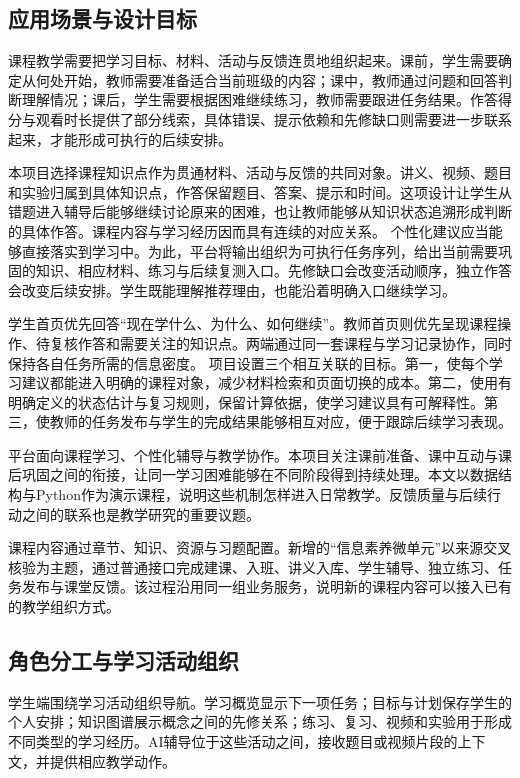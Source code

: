 \documentclass[UTF8,zihao=-4,fontset=none,a4paper]{ctexart}
\begin{document}
\subsection{应用场景与设计目标}

课程教学需要把学习目标、材料、活动与反馈连贯地组织起来。课前，学生需要确定从何处开始，教师需要准备适合当前班级的内容；课中，教师通过问题和回答判断理解情况；课后，学生需要根据困难继续练习，教师需要跟进任务结果。作答得分与观看时长提供了部分线索，具体错误、提示依赖和先修缺口则需要进一步联系起来，才能形成可执行的后续安排。

本项目选择课程知识点作为贯通材料、活动与反馈的共同对象。讲义、视频、题目和实验归属到具体知识点，作答保留题目、答案、提示和时间。这项设计让学生从错题进入辅导后能够继续讨论原来的困难，也让教师能够从知识状态追溯形成判断的具体作答。课程内容与学习经历因而具有连续的对应关系。
个性化建议应当能够直接落实到学习中。为此，平台将输出组织为可执行任务序列，给出当前需要巩固的知识、相应材料、练习与后续复测入口。先修缺口会改变活动顺序，独立作答会改变后续安排。学生既能理解推荐理由，也能沿着明确入口继续学习。

学生首页优先回答“现在学什么、为什么、如何继续”。教师首页则优先呈现课程操作、待复核作答和需要关注的知识点。两端通过同一套课程与学习记录协作，同时保持各自任务所需的信息密度。
项目设置三个相互关联的目标。第一，使每个学习建议都能进入明确的课程对象，减少材料检索和页面切换的成本。第二，使用有明确定义的状态估计与复习规则，保留计算依据，使学习建议具有可解释性。第三，使教师的任务发布与学生的完成结果能够相互对应，便于跟踪后续学习表现。

平台面向课程学习、个性化辅导与教学协作。本项目关注课前准备、课中互动与课后巩固之间的衔接，让同一学习困难能够在不同阶段得到持续处理。本文以数据结构与Python作为演示课程，说明这些机制怎样进入日常教学。反馈质量与后续行动之间的联系也是教学研究的重要议题\cite{bloom,hattie,vanlehn}。

课程内容通过章节、知识、资源与习题配置。新增的“信息素养微单元”以来源交叉核验为主题，通过普通接口完成建课、入班、讲义入库、学生辅导、独立练习、任务发布与课堂反馈。该过程沿用同一组业务服务，说明新的课程内容可以接入已有的教学组织方式。


\subsection{角色分工与学习活动组织}

学生端围绕学习活动组织导航。学习概览显示下一项任务；目标与计划保存学生的个人安排；知识图谱展示概念之间的先修关系；练习、复习、视频和实验用于形成不同类型的学习经历。AI辅导位于这些活动之间，接收题目或视频片段的上下文，并提供相应教学动作。
\end{document}
